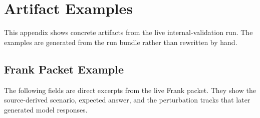 \section{Artifact Examples}

This appendix shows concrete artifacts from the live internal-validation run. The examples are generated from the run bundle rather than rewritten by hand.

\subsection{Frank Packet Example}

The following fields are direct excerpts from the live Frank packet. They show the source-derived scenario, expected answer, and the perturbation tracks that later generated model responses.

